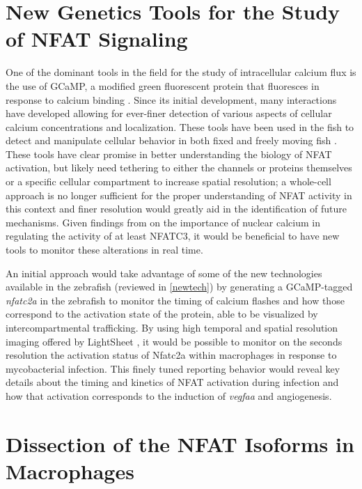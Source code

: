 \section{New Genetics Tools for the Study of NFAT Signaling}

One of the dominant tools in the field for the study of intracellular calcium flux is the use of GCaMP, a modified green fluorescent protein that fluoresces in response to calcium binding \citep{Nakai2001}. Since its initial development, many interactions have developed allowing for ever-finer detection of various aspects of cellular calcium concentrations and localization. These tools have been used in the fish to detect and manipulate cellular behavior in both fixed and freely moving fish \citep{Beerman2015, Kim2017}. These tools have clear promise in better understanding the biology of NFAT activation, but likely need tethering to either the channels or proteins themselves or a specific cellular compartment to increase spatial resolution; a whole-cell approach is no longer sufficient for the proper understanding of NFAT activity in this context and finer resolution would greatly aid in the identification of future mechanisms. Given findings from \citet{Kar2015} on the importance of nuclear calcium in regulating the activity of at least NFATC3, it would be beneficial to have new tools to monitor these alterations in real time. 

An initial approach would take advantage of some of the new technologies available in the zebrafish (reviewed in \autoref{newtech}) by generating a GCaMP-tagged \textit{nfatc2a} in the zebrafish to monitor the timing of calcium flashes and how those correspond to the activation state of the protein, able to be visualized by intercompartmental trafficking. By using high temporal and spatial resolution imaging offered by LightSheet \citep{Reynaud2008}, it would be possible to monitor on the seconds resolution the activation status of Nfatc2a within macrophages in response to mycobacterial infection. This finely tuned reporting behavior would reveal key details about the timing and kinetics of NFAT activation during infection and how that activation corresponds to the induction of \textit{vegfaa} and angiogenesis.

\section{Dissection of the NFAT Isoforms in Macrophages}

\citep{Shiau2015} %


